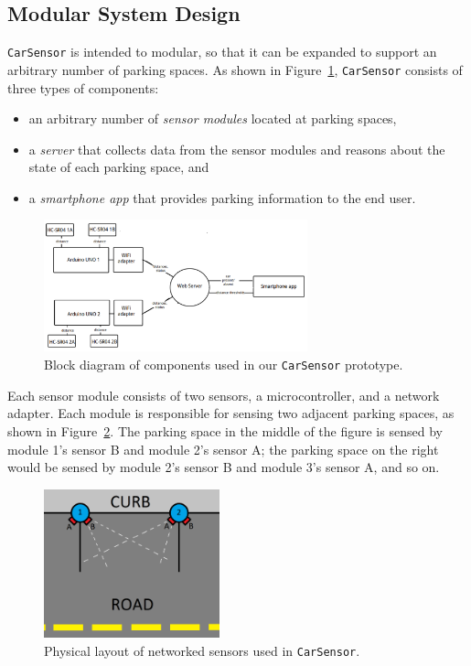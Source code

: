 \documentclass[conference]{IEEEtran}
\begin{document}
\subsection{Modular System Design}
\texttt{CarSensor} is intended to modular, so that it can be expanded to support an arbitrary number of parking spaces. As shown in Figure~\ref{fig_blockdiagram}, \texttt{CarSensor} consists of three types of components:
\begin{itemize}
\item an arbitrary number of \textit{sensor modules} located at parking spaces,
\item a \textit{server} that collects data from the sensor modules and reasons about the state of each parking space, and
\item a \textit{smartphone app} that provides parking information to the end user.
\end{itemize}

\begin{figure}[h]
\centering
\includegraphics[width=3.0in]{block_diagram_0.png}
\caption{Block diagram of components used in our \texttt{CarSensor} prototype.}
\label{fig_blockdiagram}
\end{figure}

Each sensor module consists of two sensors, a microcontroller, and a network adapter. Each module is responsible for sensing two adjacent parking spaces, as shown in Figure~\ref{fig_curb}. The parking space in the middle of the figure is sensed by module 1's sensor B and module 2's sensor A; the parking space on the right would be sensed by module 2's sensor B and module 3's sensor A, and so on.
\begin{figure}[h]
\centering
\includegraphics[width=2.0in]{parkingspace.png}
\caption{Physical layout of networked sensors used in \texttt{CarSensor}.}
\label{fig_curb}
\end{figure}
\end{document}

